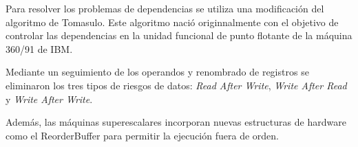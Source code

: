 \bigskip
Para resolver los problemas de dependencias se utiliza una 
modificación del algoritmo de Tomasulo. Este algoritmo nació
originnalmente con el objetivo de controlar las dependencias en 
la unidad funcional de punto flotante de la máquina 360/91 de IBM.

\bigskip
Mediante un seguimiento de los operandos y renombrado de 
registros se eliminaron los tres tipos de riesgos de datos:
\textit{Read After Write}, \textit{Write After Read} 
y \textit{Write After Write}. 

\bigskip
Además, las máquinas superescalares incorporan nuevas 
estructuras de hardware como el ReorderBuffer para permitir
la ejecución fuera de orden.